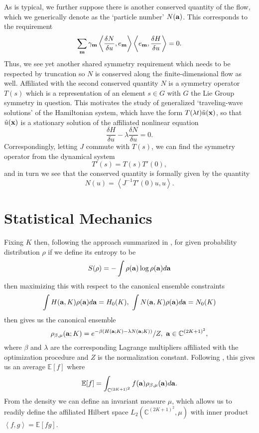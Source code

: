 \documentclass[aps,prl,preprint,groupedaddress]{revtex4-1}
\begin{document}
As is typical, we further suppose there is another conserved quantity of the flow, which we generically denote as the `particle number' $N({\bf a})$.  This corresponds to the requirement
\[
\sum_{{\bf m}}\gamma_{{\bf m}} \left<\frac{\delta N}{\delta u}, e_{{\bf m}} \right> \left<e_{{\bf m}},\frac{\delta H}{\delta u} \right> = 0.
\]
Thus, we see yet another shared symmetry requirement which needs to be respected by truncation so $N$ is conserved along the finite-dimensional flow as well.  Affiliated with the second conserved quantity $N$ is a symmetry operator $T(s)$ which is a representation of an element $s\in G$ with $G$ the Lie Group symmetry in question.  This motivates the study of generalized `traveling-wave solutions' of the Hamiltonian system, which have the form $T(\lambda t)\tilde{u}({\bf x})$, so that $\tilde{u}({\bf x})$ is a stationary solution of the affiliated nonlinear equation
\begin{equation}
\frac{\delta H}{\delta u} - \lambda \frac{\delta N}{\delta u} = 0.
\label{varpb}
\end{equation}
Correspondingly, letting $J$ commute with $T(s)$, we can find the symmetry operator from the dynamical system
\[
T'(s) = T(s)T'(0), 
\]
and in turn we see that the conserved quantity is formally given by the quantity
\[
N(u) = \left<J^{-1}T'(0)u ,u\right>.
\]
\section*{Statistical Mechanics}

Fixing $K$ then, following the approach summarized in \cite{majda}, for given probability distribution $\rho$ if we define its entropy to be 
\[
S(\rho) = -\int \rho({\bf a})\log\rho({\bf a}) d {\bf a}
\]
then maximizing this with respect to the canonical ensemble constraints 
\[
\int H({\bf a},K)\rho({\bf a})d{\bf a} = H_{0}(K), ~ \int N({\bf a},K)\rho({\bf a})d{\bf a} = N_{0}(K)
\]
then gives us the canonical ensemble 
\[
\rho_{\beta,\mu}({\bf a};K) = e^{-\beta(H({\bf a};K) -\lambda N({\bf a};K))}/Z, ~ {\bf a} \in \mathbb{C}^{(2K+1)^{2}},
\]
where $\beta$ and $\lambda$ are the corresponding Lagrange multipliers affiliated with the optimization procedure and $Z$ is the normalization constant.  Following \cite{chorin}, this gives us an average $\mathbb{E}[f]$ where 
\[
\mathbb{E}[f] = \int_{\mathbb{C}^{(2K+1)^{2}}} f({\bf a})\rho_{\beta,\mu}({\bf a})d{\bf a}.
\]
From the density we can define an invariant measure $\mu$, which allows us to readily define the affiliated Hilbert space $L_{2}(\mathbb{C}^{(2K+1)^{2}},\mu)$ with inner product $\left<f,g\right> = \mathbb{E}[fg]$.  
\end{document}
